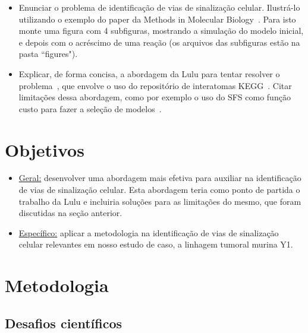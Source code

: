 \documentclass[12pt]{article}
\begin{document}
\begin{itemize}

\item Enunciar o problema de identificação de vias de sinalização celular. Ilustrá-lo utilizando o exemplo do paper da Methods in Molecular Biology~\cite{Reis2017interdisciplinary}. Para isto monte uma figura com 4 subfiguras, mostrando a simulação do modelo inicial, e depois com o acréscimo de uma reação (os arquivos das subfiguras estão na pasta ``figures").

\item Explicar, de forma concisa, a abordagem da Lulu para tentar resolver o problema~\cite{Wu2015metodo}, que envolve o uso do repositório de interatomas KEGG~\cite{Kanehisa2000kegg}. Citar limitações dessa abordagem, como por exemplo o uso do SFS como função custo para fazer a seleção de modelos~\cite{Whitney:1971}.

\end{itemize}


\section{Objetivos}

\begin{itemize}

\item \underline{Geral:} desenvolver uma abordagem mais efetiva para auxiliar na identificação de vias de sinalização celular. Esta abordagem teria como ponto de partida o trabalho da Lulu e incluiria soluções para as limitações do mesmo, que foram discutidas na seção anterior.

\item \underline{Específico:} aplicar a metodologia na identificação de vias de sinalização celular relevantes em nosso estudo de caso, a linhagem tumoral murina Y1.

\end{itemize}


\section{Metodologia}



\subsection{Desafios científicos}
\end{document}
